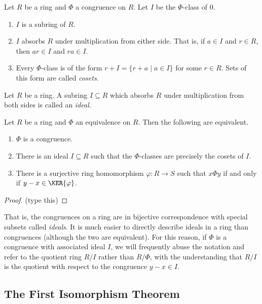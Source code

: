 \documentclass{article}
\begin{document}
\begin{prop}
Let $R$ be a ring and $\Phi$ a congruence on $R$. Let $I$ be the $\Phi$-class of 0.
\begin{enumerate}
\item $I$ is a subring of $R$.
\item $I$ absorbs $R$ under multiplication from either side. That is, if $a \in I$ and $r \in R$, then $ar \in I$ and $ra \in I$.
\item Every $\Phi$-class is of the form $r + I = \{ r+a \mid a \in I \}$ for some $r \in R$. Sets of this form are called \emph{cosets}.
\end{enumerate}
\end{prop}

\begin{dfn}[Ideal]
Let $R$ be a ring. A subring $I \subseteq R$ which absorbs $R$ under multiplication from both sides is called an \emph{ideal}. 
\end{dfn}

\begin{prop}
Let $R$ be a ring and $\Phi$ an equivalence on $R$. Then the following are equivalent.
\begin{enumerate}
\item $\Phi$ is a congruence.
\item There is an ideal $I \subseteq R$ such that the $\Phi$-classes are precisely the cosets of $I$.
\item There is a surjective ring homomorphism $\varphi : R \rightarrow S$ such that $x \Phi y$ if and only if $y-x \in \KER{\varphi}$.
\end{enumerate}
\end{prop}

\begin{proof}
(type this)
\end{proof}

That is, the congruences on a ring are in bijective correspondence with special subsets called \emph{ideals}. It is much easier to directly describe ideals in a ring than congruences (although the two are equivalent). For this reason, if $\Phi$ is a congruence with associated ideal $I$, we will frequently abuse the notation and refer to the quotient ring $R/I$ rather than $R/\Phi$, with the understanding that $R/I$ is the quotient with respect to the congruence $y-x \in I$.

\subsection*{The First Isomorphism Theorem}
\end{document}
